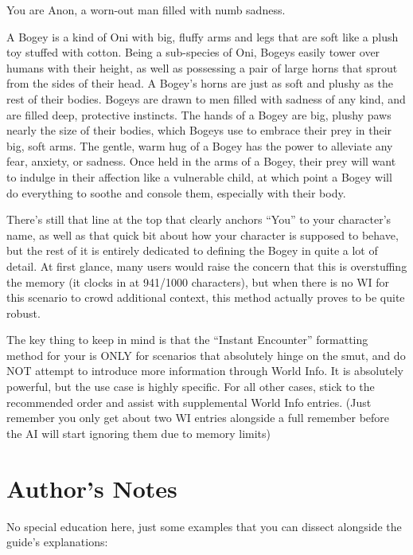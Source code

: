 \documentclass[Coomer-main.tex]{subfiles}
\begin{document}
\begin{/rm}
You are Anon, a worn-out man filled with numb sadness.
\bigskip

A Bogey is a kind of Oni with big, fluffy arms and legs that are soft like a plush toy stuffed with cotton. Being a sub-species of Oni, Bogeys easily tower over humans with their height, as well as possessing a pair of large horns that sprout from the sides of their head. A Bogey's horns are just as soft and plushy as the rest of their bodies. Bogeys are drawn to men filled with sadness of any kind, and are filled deep, protective instincts. The hands of a Bogey are big, plushy paws nearly the size of their bodies, which Bogeys use to embrace their prey in their big, soft arms. The gentle, warm hug of a Bogey has the power to alleviate any fear, anxiety, or sadness. Once held in the arms of a Bogey, their prey will want to indulge in their affection like a vulnerable child, at which point a Bogey will do everything to soothe and console them, especially with their body.
\end{/rm}

There’s still that line at the top that clearly anchors “You” to your character’s name, as well as that quick bit about how your character is supposed to behave, but the rest of it is entirely dedicated to defining the Bogey in quite a lot of detail. At first glance, many users would raise the concern that this is overstuffing the memory (it clocks in at 941/1000 characters), but when there is no WI for this scenario to crowd additional context, this method actually proves to be quite robust.

The key thing to keep in mind is that the “Instant Encounter” formatting method for your \rem is ONLY for scenarios that absolutely hinge on the smut, and do NOT attempt to introduce more information through World Info. It is absolutely powerful, but the use case is highly specific. For all other cases, stick to the recommended order and assist with supplemental World Info entries. (Just remember you only get about two WI entries alongside a full remember before the AI will start ignoring them due to memory limits)

\section{Author’s Notes}

No special education here, just some examples that you can dissect alongside the guide’s explanations:
\end{document}
